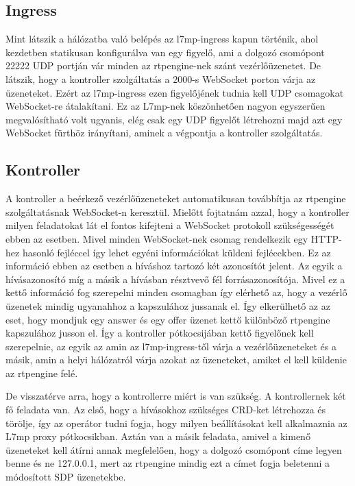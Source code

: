 \subsection{Ingress}

Mint látszik a hálózatba való belépés az l7mp-ingress kapun történik, ahol kezdetben
statikusan konfigurálva van egy figyelő, ami a dolgozó csomópont 22222 UDP portján
vár minden az rtpengine-nek szánt vezérlőüzenetet. De látszik, hogy a kontroller szolgáltatás
a 2000-s WebSocket porton várja az üzeneteket. Ezért az l7mp-ingress ezen figyelőjének 
tudnia kell UDP csomagokat WebSocket-re átalakítani. Ez az L7mp-nek köszönhetően nagyon
egyszerűen megvalósítható volt ugyanis, elég csak egy UDP figyelőt létrehozni majd azt 
egy WebSocket fürthöz irányítani, aminek a végpontja a kontroller szolgáltatás. 


\subsection{Kontroller}
A kontroller a beérkező vezérlőüzeneteket automatikusan továbbítja az rtpengine 
szolgáltatásnak WebSocket-n keresztül. Mielőtt fojtatnám azzal, hogy a kontroller milyen 
feladatokat lát el fontos kifejteni a WebSocket protokoll szükségességét ebben az esetben.
Mivel minden WebSocket-nek  csomag rendelkezik egy HTTP-hez hasonló fejléccel így
lehet egyéni információkat küldeni fejlécekben. Ez az információ ebben az esetben a híváshoz
tartozó  két azonosítót jelent. Az egyik a hívásazonosító míg a másik a hívásban résztvevő
fél forrásazonosítója. Mivel ez a kettő információ fog szerepelni minden csomagban így elérhető az,
hogy a vezérlő üzenetek mindig ugyanahhoz a kapszulához jussanak el. Így elkerülhető az
az eset, hogy mondjuk egy answer és egy offer üzenet kettő különböző rtpengine kapszulához
jusson el. Így a kontroller pótkocsijában kettő figyelőnek kell szerepelnie, az egyik
az amin az l7mp-ingress-től várja a vezérlőüzeneteket és a másik, amin a helyi hálózatról
várja azokat az üzeneteket, amiket el kell küldenie az rtpengine felé. 

De visszatérve arra, hogy a kontrollerre miért is van szükség. A kontrollernek két fő feladata
van. Az első, hogy a hívásokhoz szükséges CRD-ket létrehozza és törölje, így az operátor tudni fogja,
hogy milyen beállításokat kell alkalmaznia az L7mp proxy pótkocsikban. Aztán van a másik feladata,
amivel a kimenő üzeneteket kell átírni annak megfelelően, hogy a dolgozó csomópont
címe legyen benne és ne 127.0.0.1, mert az rtpengine mindig ezt a címet fogja beletenni
a módosított SDP üzenetekbe. 

